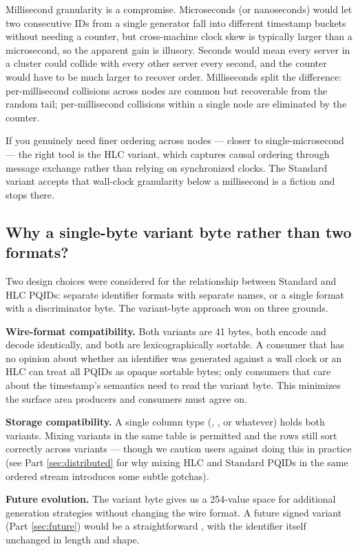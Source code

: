Millisecond granularity is a compromise. Microseconds (or nanoseconds) would let two consecutive IDs from a single generator fall into different timestamp buckets without needing a counter, but cross-machine clock skew is typically larger than a microsecond, so the apparent gain is illusory. Seconds would mean every server in a cluster could collide with every other server every second, and the counter would have to be much larger to recover order. Milliseconds split the difference: per-millisecond collisions across nodes are common but recoverable from the random tail; per-millisecond collisions within a single node are eliminated by the counter.

If you genuinely need finer ordering across nodes --- closer to single-microsecond --- the right tool is the HLC variant, which captures causal ordering through message exchange rather than relying on synchronized clocks. The Standard variant accepts that wall-clock granularity below a millisecond is a fiction and stops there.

\subsection{Why a single-byte variant byte rather than two formats?}

Two design choices were considered for the relationship between Standard and HLC PQIDs: separate identifier formats with separate names, or a single format with a discriminator byte. The variant-byte approach won on three grounds.

\textbf{Wire-format compatibility.} Both variants are 41 bytes, both encode and decode identically, and both are lexicographically sortable. A consumer that has no opinion about whether an identifier was generated against a wall clock or an HLC can treat all PQIDs as opaque sortable bytes; only consumers that care about the timestamp's semantics need to read the variant byte. This minimizes the surface area producers and consumers must agree on.

\textbf{Storage compatibility.} A single column type (, , or whatever) holds both variants. Mixing variants in the same table is permitted and the rows still sort correctly across variants --- though we caution users against doing this in practice (see Part \ref{sec:distributed} for why mixing HLC and Standard PQIDs in the same ordered stream introduces some subtle gotchas).

\textbf{Future evolution.} The variant byte gives us a 254-value space for additional generation strategies without changing the wire format. A future signed variant (Part \ref{sec:future}) would be a straightforward , with the identifier itself unchanged in length and shape.

